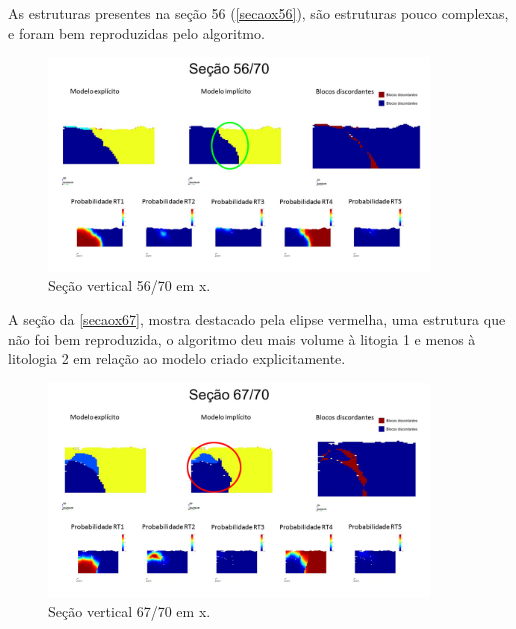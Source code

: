 As estruturas presentes na seção 56 (\autoref{secaox56}), são estruturas pouco complexas, e foram bem reproduzidas pelo algoritmo.

\begin{figure}[H]
	\caption{\label{secaox56}Seção vertical 56/70 em x.}
	\begin{center}
		\includegraphics[width=0.9\textwidth]{estudo_de_caso/secaox56}
	\end{center}
\end{figure}

A seção da \autoref{secaox67}, mostra destacado pela elipse vermelha, uma estrutura que não foi bem reproduzida, o algoritmo deu mais volume à litogia 1 e menos à litologia 2 em relação ao modelo criado explicitamente. 

\begin{figure}[H]
	\caption{\label{secaox67}Seção vertical 67/70 em x.}
	\begin{center}
		\includegraphics[width=0.9\textwidth]{estudo_de_caso/secaox67}
	\end{center}
\end{figure}

